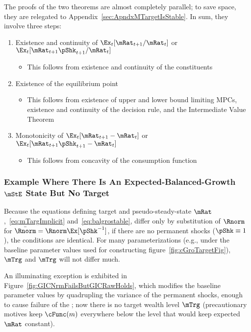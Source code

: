 \documentclass[BufferStockTheory]{subfiles}
\begin{document}
The proofs of the two theorems are almost completely parallel; to save space, they are relegated to Appendix~\ref{sec:ApndxMTargetIsStable}.  In sum, they involve three steps:

\begin{enumerate}
\item Existence and continuity of $\Ex_{t}[\mRat_{t+1}/\mRat_{t}]$ or $\Ex_{t}[\mRat_{t+1}\pShk_{t+1}/\mRat_{t}]$
  \begin{itemize}
  \item This follows from existence and continuity of the constituents
  \end{itemize}
\item Existence of the equilibrium point
  \begin{itemize}
  \item This follows from existence of upper and lower bound limiting MPCs, existence and continuity of the decision rule, and the Intermediate Value Theorem
  \end{itemize}
\item Monotonicity of $\Ex_{t}[{\mRat}_{t+1}-\mRat_{t}]$ or $\Ex_{t}[{\mRat}_{t+1}\pShk_{t+1}-\mRat_{t}]$
  \begin{itemize}
  \item This follows from concavity of the consumption function
  \end{itemize}
\end{enumerate}

\subsubsection{Example Where There Is An Expected-Balanced-Growth
  \texorpdfstring{$\mStE$}{m} State But No Target}

Because the equations defining target and pseudo-steady-state $\mRat$,~\eqref{eq:mTargImplicit} and~\eqref{eq:balgrostable}, differ only by substitution of $\Rnorm$ for $\bar{\Rnorm}=\Rnorm \Ex[\pShk^{-1}]$, if there are no permanent shocks ($\pShk \equiv 1$), the conditions are identical.  For many parameterizations (e.g., under the baseline parameter values used for constructing figure~\ref{fig:cGroTargetFig}), $\mTrg$ and $\mTrg$ will not differ much.

An illuminating exception is exhibited in Figure~\ref{fig:GICNrmFailsButGICRawHolds}, which modifies the baseline parameter values by quadrupling the variance of the permanent shocks, enough to cause failure of the \GICNrm; now there is no target wealth level $\mTrg$ (precautionary motives keep $\cFunc(m)$ everywhere below the level that would keep expected $\mRat$ constant).
\end{document}
